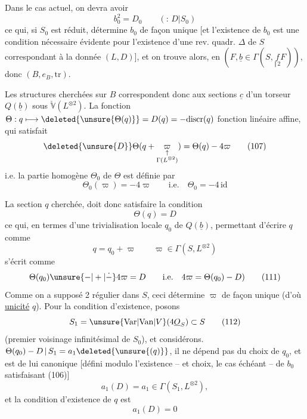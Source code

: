 
Dans le cas actuel, on devra avoir
\[b_0^2=D_0\qquad({:}\,D|S_0)\tag*{(106)}\]
ce qui, si $S_0$ est réduit, détermine $b_0$ de façon unique [et l'existence de $b_0$ est une
condition nécessaire évidente pour l'existence d'une rev. quadr. $\Delta$ de $S$ correspondant à la donnée $(L,D)$], et on trouve alors, en    $(F,\underline b\in\Gamma(S,\underset{\scriptscriptstyle\Vert\,2}{f}F))$, donc $(B,e_B,\mathrm{tr})$.

Les structures  cherchées  sur $B$ correspondent donc aux sections $\underline c$ d'un  torseur $Q(\underline b)$ sous $\check{\mathbb V}(L^{\otimes2})$.  La fonction \deleted{$\unsure{\Theta(}$} $\Theta:q\longmapsto\deleted{\unsure{\Theta(q)}}=D(q)=-\mathrm{discr}(q)$    fonction linéaire affine, qui satisfait
\[\deleted{\unsure{D}}\Theta(q+\underset{\substack{\uparrow\\\Gamma(L^{\otimes2})}}{\varpi})=\Theta(q)-4\varpi\tag*{(107)}\]
i.e. la partie homogène $\Theta_0$ de $\Theta$ est définie par
\[\Theta_0(\varpi)=-4\varpi\qquad\text{i.e.}\quad\Theta_0=-4\,\mathrm{id}\tag*{(108)}\]

La section $q$ cherchée, doit donc satisfaire la condition
\[\Theta(q)=D\tag*{(109)}\]
ce qui, en termes d'une trivialisation locale $q_0$ de $Q(\underline b)$, permettant d'écrire $q$ comme
\[q=q_0+\varpi\qquad\varpi\in\Gamma(S,L^{\otimes2})\tag*{(110)}\]
s'écrit comme
\[\Theta(q_0)\unsure{-|+|\dot{-}}4\varpi=D\qquad\text{i.e.}\quad4\varpi=\Theta(q_0)-D)\tag*{(111)}\]
Comme on a supposé 2 régulier dans $S$, ceci  détermine $\varpi$ de façon unique (d'où \uline{unicité}  $q$). Pour la condition d'existence, posons
\[S_1=\unsure{\mathrm{Var}|\mathrm{Van}|V}(4\underline O_S)\subset S\tag*{(112)}\]
(premier voisinage infinitésimal de $S_0$), et considérons. $\Theta(q_0)-D\,|\,S_1=a_1\deleted{\unsure{(q)}}$, il ne dépend pas du choix de $q_0$, et est de lui  canonique [défini modulo l'existence -- et choix, le cas échéant -- de $b_0$ satisfaisant (106)]
\[a_1(D)=a_1\in\Gamma(S_1,L^{\otimes2}),\tag*{(113)}\]
et la condition  d'existence de $q$ est
\[a_1(D)=0\tag*{(114)}\]

